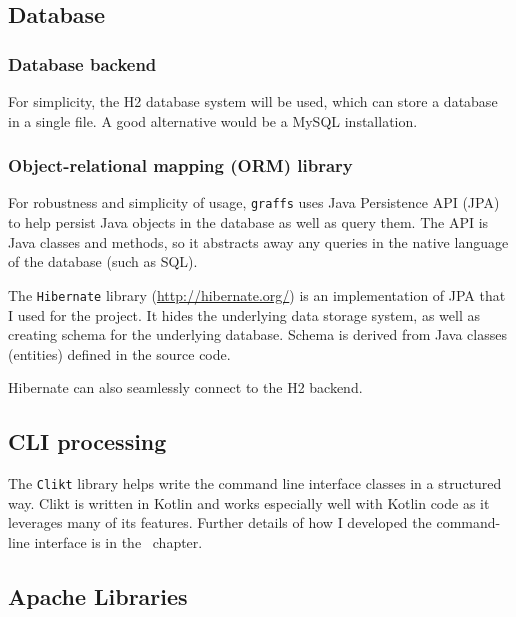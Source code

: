 \subsection{Database}

\subsubsection{Database backend}

For simplicity, the H2 database system will be used, which can store a database in a single file.
A good alternative would be a MySQL installation.

\subsubsection{Object-relational mapping (ORM) library}

For robustness and simplicity of usage, \texttt{graffs} uses Java Persistence API (JPA) to help persist Java objects in the database as well as query them.
The API is Java classes and methods, so it abstracts away any queries in the native language of the database (such as SQL).

The \texttt{Hibernate} library (\url{http://hibernate.org/}) is an implementation of JPA that I used for the project.
It hides the underlying data storage system, as well as creating schema for the underlying database.
Schema is derived from Java classes (entities) defined in the source code.

Hibernate can also seamlessly connect to the H2 backend.

\subsection{CLI processing}

The \texttt{Clikt} library helps write the command line interface classes in a structured way.
Clikt is written in Kotlin and works especially well with Kotlin code as it leverages many of its features.
Further details of how I developed the command-line interface is in the~ chapter.

\subsection{Apache Libraries}

